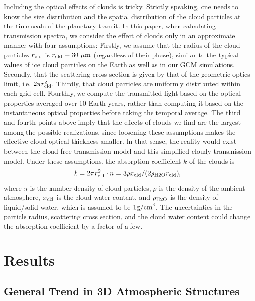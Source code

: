 \documentclass[11pt,numberedappendix,twocolappendix,]{emulateapj}
\begin{document}
Including the optical effects of clouds is tricky. 
Strictly speaking, one needs to know the size distribution and the spatial distribution of the cloud particles at the time scale of the planetary transit. 
In this paper, when calculating transmission spectra, we consider the effect of clouds only in an approximate manner with four assumptions:
%
Firstly, we assume that the radius of the cloud particles $r_{\rm cld}$ is $r_{\rm cld}=30~\mu {\rm m}$ (regardless of their phase), similar to the typical values of ice cloud particles on the Earth as well as in our GCM simulations.  
%
Secondly, that the scattering cross section is given by that of the geometric optics limit, i.e. $2 \pi r_{\rm cld}^2$. 
%
Thirdly, that cloud particles are uniformly distributed within each grid cell. 
%
Fourthly, we compute the transmitted light based on the optical properties averaged over 10 Earth years, rather than computing it based on the instantaneous optical properties before taking the temporal average. 
%
The third and fourth points above imply that the effects of clouds we find are the largest among the possible realizations, since loosening these assumptions makes the effective cloud optical thickness smaller. 
In that sense, the reality would exist between the cloud-free transmission model and this simplified cloudy transmission model. 
Under these assumptions, the absorption coefficient $k$ of the clouds is %
\begin{equation}
k = 2 \pi r_{\rm cld}^2 \cdot n = 3 \rho x_{\rm cld} / ( 2 \rho_{\rm H2O} r_{\rm cld} ),
\end{equation}
where $n$ is the number density of cloud particles, $\rho $ is the density of the ambient atmosphere, $x_{\rm cld}$ is the cloud water content, and $\rho_{\rm H2O}$ is the density of liquid/solid water, which is assumed to be $1 {\rm g/cm}^3$. 
The uncertainties in the particle radius, scattering cross section, and the cloud water content could change the absorption coefficient by a factor of a few. 


\section{Results}
\label{s:results}

\subsection{General Trend in 3D Atmospheric Structures}
\label{ss:result_H2Omixingratio}
\end{document}
